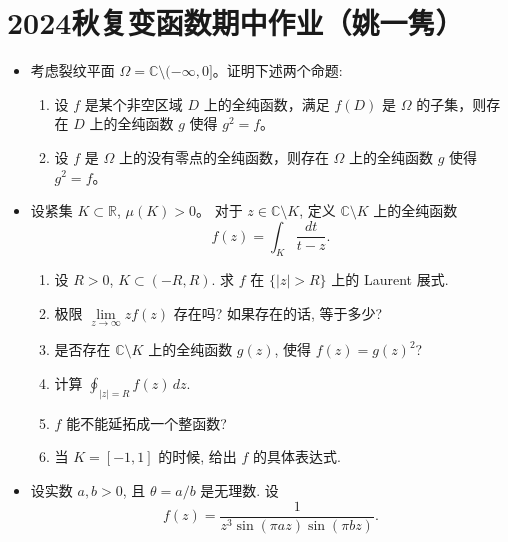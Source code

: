\section{2024秋复变函数期中作业（姚一隽）}
\begin{itemize}
\item[1.] 考虑裂纹平面 $\Omega = \mathbb{C} \setminus (-\infty, 0]$。证明下述两个命题:

\begin{enumerate}
    \item[(i)] 设 $f$ 是某个非空区域 $D$ 上的全纯函数，满足 $f(D)$ 是 $\Omega$ 的子集，则存在 $D$ 上的全纯函数 $g$ 使得 $g^2 = f$。
    \item[(ii)] 设 $f$ 是 $\Omega$ 上的没有零点的全纯函数，则存在 $\Omega$ 上的全纯函数 $g$ 使得 $g^2 = f$。
\end{enumerate}

\item[2.] 设紧集 $K \subset \mathbb{R}$, $\mu(K) > 0$。
对于 $z \in \mathbb{C} \setminus K$, 定义 $\mathbb{C} \setminus K$ 上的全纯函数
\[ f(z) = \int_K \frac{dt}{t - z}. \]

\begin{enumerate}[label=(\arabic*)]
    \item 设 $R > 0$, $K \subset (-R, R)$. 求 $f$ 在 $\{|z| > R\}$ 上的 Laurent 展式.
    \item 极限 $\lim\limits_{z \to \infty} z f(z)$ 存在吗? 如果存在的话, 等于多少?
    \item 是否存在 $\mathbb{C} \setminus K$ 上的全纯函数 $g(z)$, 使得 $f(z) = g(z)^2$?
    \item 计算 $\displaystyle\oint_{|z|=R} f(z) \, dz$.
    \item $f$ 能不能延拓成一个整函数?
    \item 当 $K = [-1, 1]$ 的时候, 给出 $f$ 的具体表达式.
\end{enumerate}

\item[3.] 设实数 $a, b > 0$, 且 $\theta = a/b$ 是无理数. 设
\[ f(z) = \frac{1}{z^3 \sin(\pi az) \sin(\pi bz)}. \]


\end{itemize}
